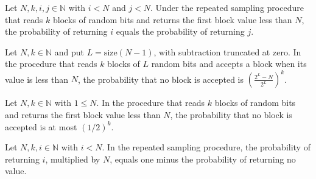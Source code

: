\begin{theorem}
\label{Randomized.randProb_uniformSample_eq}
\leanok
{}
Let $N,k,i,j\in\mathbb{N}$ with $i<N$ and $j<N$. Under the repeated sampling procedure
that reads $k$ blocks of random bits and returns the first block value less than $N$,
the probability of returning $i$ equals the probability of returning $j$.
\end{theorem}

\begin{theorem}
\label{Randomized.randProb_uniformSample_none}
\leanok
{}
Let $N,k\in\mathbb{N}$ and put $L=\mathrm{size}(N-1)$, with subtraction truncated at
zero. In the procedure that reads $k$ blocks of $L$ random bits and accepts a block when
its value is less than $N$, the probability that no block is accepted is
$\left(\frac{2^L-N}{2^L}\right)^k$.
\end{theorem}

\begin{theorem}
\label{Randomized.randProb_uniformSample_none_le}
\leanok
{}
Let $N,k\in\mathbb{N}$ with $1\le N$. In the procedure that reads $k$ blocks of random
bits and returns the first block value less than $N$, the probability that no block is
accepted is at most $(1/2)^k$.
\end{theorem}

\begin{theorem}
\label{Randomized.randProb_uniformSample_some_mul}
\leanok
{}
Let $N,k,i\in\mathbb{N}$ with $i<N$. In the repeated sampling procedure, the probability
of returning $i$, multiplied by $N$, equals one minus the probability of returning no
value.
\end{theorem}

